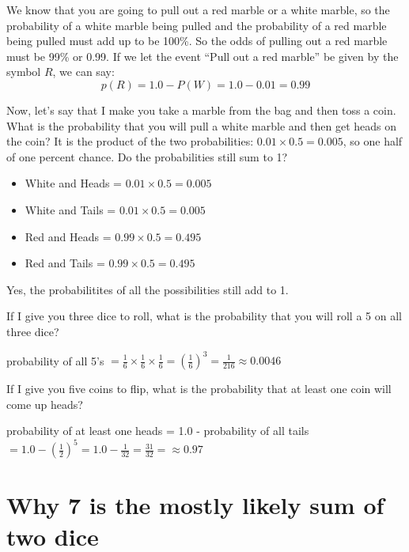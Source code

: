 We know that you are going to pull out a red marble or a white marble,
so the probability of a white marble being pulled and the probability
of a red marble being pulled must add up to be 100\%.  So the odds of
pulling out a red marble must be 99\% or 0.99. If we let the event ``Pull out a red marble'' be given by the symbol $R$, we can say:
\begin{equation*}
  p(R) = 1.0 - P(W) = 1.0 - 0.01 = 0.99
\end{equation*}

Now, let's say that I make you take a marble from the bag and then
toss a coin. What is the probability that you will pull a white marble
and then get heads on the coin? It is the product of the two
probabilities: $0.01 \times 0.5 = 0.005$, so one half of one percent
chance.  Do the probabilities still sum to 1?
\begin{itemize}
\item White and Heads = $0.01 \times 0.5 = 0.005$
\item White and Tails = $0.01 \times 0.5 = 0.005$
\item Red and Heads = $0.99 \times 0.5 = 0.495$
\item Red and Tails = $0.99 \times 0.5 = 0.495$
\end{itemize}
Yes, the probabilitites of all the possibilities still add to 1.

\begin{Exercise}[title={Rolling Dice}, label=rolling-dice]
  If I give you three dice to roll, what is the
  probability that you will roll a 5 on all three dice?
\end{Exercise}
\begin{Answer}[ref=rolling-dice]
  probability of all 5's $ = \frac{1}{6}\times\frac{1}{6}\times\frac{1}{6} = \left(\frac{1}{6}\right)^3 = \frac{1}{216} \approx 0.0046$
  \end{Answer}
    
\begin{Exercise}[title={Flipping Coins}, label=flipping-coins]
  If I give you five coins to flip, what is the
  probability that at least one coin will come up heads?
\end{Exercise}
\begin{Answer}[ref=rolling-dice]
  probability of at least one heads = 1.0 - probability of all tails $ = 1.0 - \left(\frac{1}{2}\right)^5 =1.0 - \frac{1}{32} = \frac{31}{32} = \approx 0.97$ 
  \end{Answer}
    
\section{Why 7 is the mostly likely sum of two dice}

